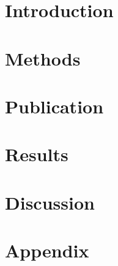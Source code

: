\documentclass[11pt, titlepage, a4paper, twoside, onecolumn, DIV=calc]{scrbook} %
\begin{document}
\tableofcontents %
\clearpage


\listoffigures %
\clearpage

\listoftables %



\clearpage


\mainmatter %


\pagestyle{raphimen}




\part{Introduction}

 

 
 
 
 
 
% 
% 

\part{Methods}




\part{Publication}
\renewcommand{\cftdot}{}


\pagestyle{raphimen}

\part{Results}




\part{Discussion}
 

\part{Appendix}
\setcounter{chapter}{8}

\end{document}
